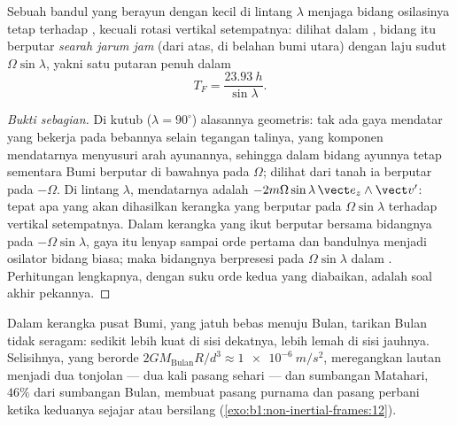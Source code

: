 \begin{proposition}\label{prop:b1:non-inertial-frames:foucault}
Sebuah bandul yang berayun dengan  kecil di lintang $\lambda$ menjaga
bidang osilasinya tetap terhadap , kecuali rotasi
vertikal setempatnya: dilihat dalam , bidang itu berputar
\emph{searah jarum jam} (dari atas, di belahan bumi utara) dengan laju sudut
$\Omega\sin\lambda$, yakni satu putaran penuh dalam
\[
T_F = \frac{\qty{23.93}{h}}{\sin\lambda} .
\]
\end{proposition}

\begin{proof}[Bukti sebagian]
Di kutub ($\lambda = 90^\circ$) alasannya geometris: tak ada gaya mendatar
yang bekerja pada bebannya selain tegangan talinya, yang komponen mendatarnya
menyusuri arah ayunannya, sehingga dalam  bidang ayunnya tetap
sementara Bumi berputar di bawahnya pada $\Omega$; dilihat dari tanah ia berputar
pada $-\Omega$. Di lintang $\lambda$,  mendatarnya adalah
$-2m\Omega\sin\lambda\,\vect e_z\wedge\vect v'$: tepat apa yang akan dihasilkan kerangka yang berputar pada
$\Omega\sin\lambda$ terhadap vertikal setempatnya. Dalam kerangka yang ikut berputar
bersama bidangnya pada $-\Omega\sin\lambda$, gaya itu lenyap sampai orde pertama
dan bandulnya menjadi osilator bidang biasa; maka bidangnya
berpresesi pada $\Omega\sin\lambda$ dalam . Perhitungan
lengkapnya, dengan suku orde kedua yang diabaikan, adalah soal akhir
pekannya.
\end{proof}

\begin{remark}\label{rem:b1:non-inertial-frames:tides}
Dalam kerangka pusat Bumi, yang jatuh bebas menuju Bulan,
tarikan Bulan tidak seragam: sedikit lebih kuat di sisi dekatnya,
lebih lemah di sisi jauhnya. Selisihnya, yang berorde $2GM_{\text{Bulan}}R/d^3
\approx \qty{1e-6}{m/s^2}$, meregangkan lautan menjadi dua tonjolan --- dua
kali pasang sehari --- dan sumbangan Matahari, $46\%$ dari sumbangan Bulan, membuat
pasang purnama dan pasang perbani ketika keduanya sejajar atau bersilang
(\cref{exo:b1:non-inertial-frames:12}).
\end{remark}

